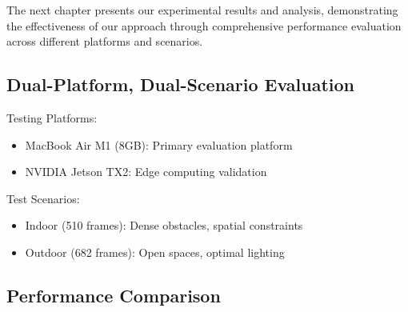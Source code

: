 \documentclass[12pt,oneside]{book}
\begin{document}
\vspace{12pt}
The next chapter presents our experimental results and analysis, demonstrating the effectiveness of our approach through comprehensive performance evaluation across different platforms and scenarios.

\subsection{Dual-Platform, Dual-Scenario Evaluation}

Testing Platforms:
\begin{itemize}
\item MacBook Air M1 (8GB): Primary evaluation platform
\item NVIDIA Jetson TX2: Edge computing validation
\end{itemize}

Test Scenarios:
\begin{itemize}
\item Indoor (510 frames): Dense obstacles, spatial constraints
\item Outdoor (682 frames): Open spaces, optimal lighting
\end{itemize}

\subsection{Performance Comparison}

\begin{table}[ht]
\centering
\caption{Performance metrics comparison between uncertainty-guided system and baseline approaches}
\label{tab:comprehensive_performance}
\end{table}
\end{document}
